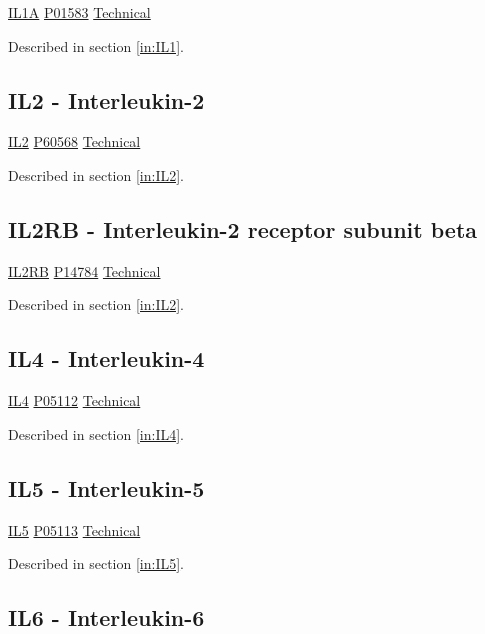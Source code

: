 \href{https://en.wikipedia.org/wiki/IL1A}{IL1A}
\href{http://www.uniprot.org/uniprot/P01583}{P01583}
\href{https://olink.com/products-services/target/protein/?assayID=5084}{Technical}

Described in section \ref{in:IL1}.

\subsection{IL2 - Interleukin-2}

\href{https://en.wikipedia.org/wiki/Interleukin\_2}{IL2}
\href{http://www.uniprot.org/uniprot/P60568}{P60568}
\href{https://olink.com/products-services/target/protein/?assayID=5063}{Technical}

Described in section \ref{in:IL2}.

\subsection{IL2RB - Interleukin-2 receptor subunit beta}

\href{https://en.wikipedia.org/wiki/IL2RB}{IL2RB}
\href{http://www.uniprot.org/uniprot/P14784}{P14784}
\href{https://olink.com/products-services/target/protein/?assayID=5083}{Technical}

Described in section \ref{in:IL2}.

\subsection{IL4 - Interleukin-4}

\href{https://en.wikipedia.org/wiki/Interleukin\_4}{IL4}
\href{http://www.uniprot.org/uniprot/P05112}{P05112}
\href{https://olink.com/products-services/target/protein/?assayID=5126}{Technical}

Described in section \ref{in:IL4}.

\subsection{IL5 - Interleukin-5}

\href{https://en.wikipedia.org/wiki/Interleukin\_5}{IL5}
\href{http://www.uniprot.org/uniprot/P05113}{P05113}
\href{https://olink.com/products-services/target/protein/?assayID=5113}{Technical}

Described in section \ref{in:IL5}.

\subsection{IL6 - Interleukin-6}

